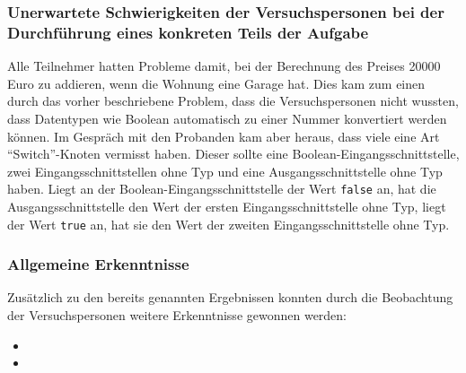 \subsubsection{Unerwartete Schwierigkeiten der Versuchspersonen bei der Durchführung eines konkreten Teils der Aufgabe}
Alle Teilnehmer hatten Probleme damit, bei der Berechnung des Preises 20000 Euro zu addieren, wenn die Wohnung eine Garage hat. Dies kam zum einen durch das vorher beschriebene Problem, dass die Versuchspersonen nicht wussten, dass Datentypen wie Boolean automatisch zu einer Nummer konvertiert werden können. Im Gespräch mit den Probanden kam aber heraus, dass viele eine Art \enquote{Switch}-Knoten vermisst haben. Dieser sollte eine Boolean-Eingangsschnittstelle, zwei Eingangsschnittstellen ohne Typ und eine Ausgangsschnittstelle ohne Typ haben. Liegt an der Boolean-Eingangsschnittstelle der Wert \texttt{false} an, hat die Ausgangsschnittstelle den Wert der ersten Eingangsschnittstelle ohne Typ, liegt der Wert \texttt{true} an, hat sie den Wert der zweiten Eingangsschnittstelle ohne Typ.

\subsubsection{Allgemeine Erkenntnisse}
Zusätzlich zu den bereits genannten Ergebnissen konnten durch die Beobachtung der Versuchspersonen weitere Erkenntnisse gewonnen werden:
\begin{itemize}
    \item {}
    \item {}
\end{itemize}